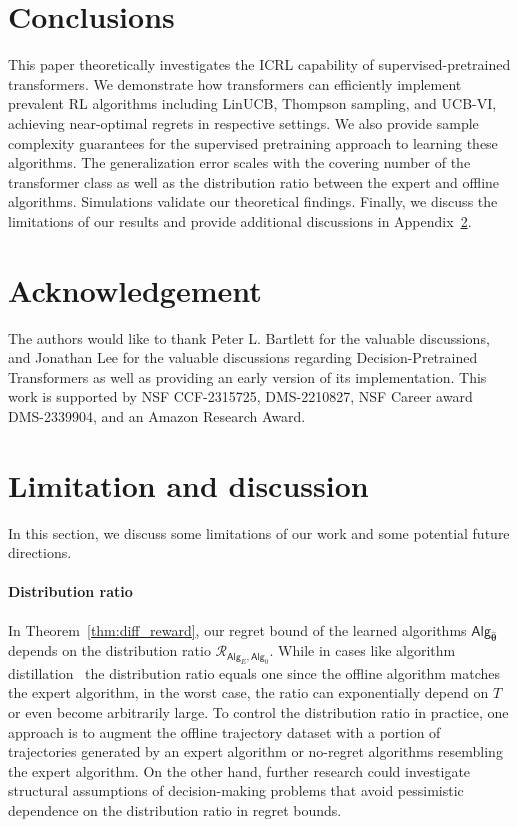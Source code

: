 \documentclass[10pt]{article}
\newcommand{\<}{\left\langle}
\renewcommand{\>}{\right\rangle}
\newcommand{\totlen}{{T}} %
\newcommand{\sAlg}{{\mathsf{Alg}}}
\newcommand{\esttfpar}{{\widehat{\btheta}}}
\newcommand{\shortexp}{{E}}
\newcommand{\distratio}{{\mathcal{R}}}
\def\btheta{{\boldsymbol \theta}}
\begin{document}
\section{Conclusions}

This paper theoretically investigates the ICRL capability of supervised-pretrained transformers. We demonstrate how transformers can efficiently implement prevalent RL algorithms including LinUCB, Thompson sampling, and UCB-VI, achieving near-optimal regrets in respective settings. We also provide sample complexity guarantees for the supervised pretraining approach to learning these algorithms. The generalization error scales with the covering number of the transformer class as well as the distribution ratio between the expert and offline algorithms. Simulations validate our theoretical findings.  
Finally, we discuss the limitations of our results and provide additional discussions in Appendix~\ref{sec:limitation}.





\section*{Acknowledgement}

The authors would like to thank Peter L. Bartlett for the valuable discussions, and Jonathan Lee for the valuable discussions regarding Decision-Pretrained Transformers as well as providing an early version of its implementation. This work is supported by NSF CCF-2315725, DMS-2210827, NSF Career award DMS-2339904, and an Amazon Research Award.




\clearpage
\appendix 
\tableofcontents
\clearpage


% 


\section{Limitation and discussion}
\label{sec:limitation}
In this section, we discuss some limitations of our work and some potential future directions. 

\paragraph{Distribution ratio} In Theorem~\ref{thm:diff_reward}, our regret bound of the learned algorithms $\sAlg_{\esttfpar}$ depends on the distribution ratio $\distratio_{\sAlg_{\shortexp},\sAlg_0}$. While in cases like algorithm distillation~\citep{laskin2022context} the distribution ratio equals one since the offline algorithm matches the expert algorithm, in the worst case, the ratio can exponentially depend on $\totlen$ or even become arbitrarily large. To control the distribution ratio in practice, one approach is to augment the offline trajectory dataset with a portion of trajectories generated by an expert algorithm or no-regret algorithms resembling the expert algorithm. On the other hand, further research could investigate structural assumptions of decision-making problems that avoid pessimistic dependence on the distribution ratio in regret bounds. 
\end{document}
